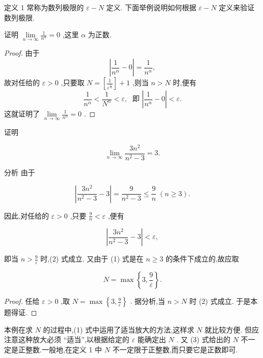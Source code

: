 定义 1 常称为数列极限的 \(\varepsilon  - N\) 定义. 下面举例说明如何根据 \(\varepsilon  - N\) 定义来验证数列极限.

\begin{example}
证明 \(\mathop{\lim }\limits_{{n \rightarrow  \infty }}\frac{1}{{n}^{\alpha }} = 0\) ,这里 \(\alpha\) 为正数.
\end{example}


\begin{proof}
由于
\[
\left| {\frac{1}{{n}^{\alpha }} - 0}\right|  = \frac{1}{{n}^{\alpha }},
\]
故对任给的 \(\varepsilon  > 0\) ,只要取 \(N = \left\lbrack  \frac{1}{{\varepsilon }^{\frac{1}{\alpha }}}\right\rbrack   + 1\) ,则当 \(n > N\) 时,便有
\[
\frac{1}{{n}^{\alpha }} < \frac{1}{{N}^{\alpha }} < \varepsilon ,\;\text{ 即 }\left| {\frac{1}{{n}^{\alpha }} - 0}\right|  < \varepsilon .
\]
这就证明了 \(\mathop{\lim }\limits_{{n \rightarrow  \infty }}\frac{1}{{n}^{\alpha }} = 0\) .

\end{proof}


\begin{example}
证明

\[
\mathop{\lim }\limits_{{n \rightarrow  \infty }}\frac{3{n}^{2}}{{n}^{2} - 3} = 3.
\]
\end{example}


分析 由于

\[
\left| {\frac{3{n}^{2}}{{n}^{2} - 3} - 3}\right|  = \frac{9}{{n}^{2} - 3} \leq  \frac{9}{n}\;\left( {n \geq  3}\right) . \tag{1}
\]

因此,对任给的 \(\varepsilon  > 0\) ,只要 \(\frac{9}{n} < \varepsilon\) ,便有

\[
\left| {\frac{3{n}^{2}}{{n}^{2} - 3} - 3}\right|  < \varepsilon , \tag{2}
\]

即当 \(n > \frac{9}{\varepsilon }\) 时,(2) 式成立. 又由于 (1) 式是在 \(n \geq  3\) 的条件下成立的,故应取

\[
N = \max \left\{  {3,\frac{9}{\varepsilon }}\right\}  . \tag{3}
\]

\begin{proof}
任给 \(\varepsilon  > 0\) ,取 \(N = \max \left\{  {3,\frac{9}{\varepsilon }}\right\}\) . 据分析,当 \(n > N\) 时 (2) 式成立. 于是本题得证.

\end{proof}


\begin{remark}
本例在求 \(N\) 的过程中,(1) 式中运用了适当放大的方法,这样求 \(N\) 就比较方便. 但应注意这种放大必须 “适当”,以根据给定的 \(\varepsilon\) 能确定出 \(N\) . 又 (3) 式给出的 \(N\) 不一定是正整数.一般地,在定义 1 中 \(N\) 不一定限于正整数,而只要它是正数即可.
\end{remark}


